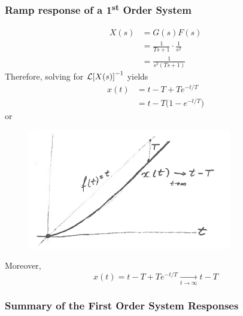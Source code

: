 \documentclass[12pt,letter]{article}
\begin{document}
\subsubsection{Ramp response of a 1\textsuperscript{st} Order System}


\begin{align}
X(s) &= G(s)F(s) \\
&= \frac{1}{Ts+1} \cdot \frac{1}{s^2} \nonumber \\
&= \frac{1}{s^2(Ts+1)}
\end{align}
Therefore, solving for $\mathcal{L}{\left[X(s)\right]}^{-1}$ yields
\begin{align}
x(t) &= t - T + Te^{-t/T} \nonumber \\
&= t - T\big(1-e^{-t/T}\big)
\end{align}
or
\begin{figure}[H]
	\centering
	\includegraphics[width=3.5in]{../figures/x_t_ramp_time_response}
\end{figure}
Moreover, 
\begin{equation}
x(t) = t-T+Te^{-t/T}  \xrightarrow[t \rightarrow \infty]{} t-T
\end{equation}

\subsubsection{Summary of the First Order System Responses}
\end{document}
